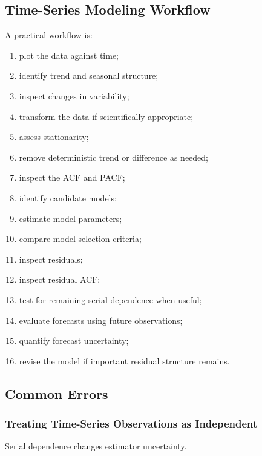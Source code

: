 \subsection{Time-Series Modeling Workflow}
\label{subsec:time-series-workflow}

A practical workflow is:

\begin{enumerate}
    \item plot the data against time;
    \item identify trend and seasonal structure;
    \item inspect changes in variability;
    \item transform the data if scientifically appropriate;
    \item assess stationarity;
    \item remove deterministic trend or difference as needed;
    \item inspect the ACF and PACF;
    \item identify candidate models;
    \item estimate model parameters;
    \item compare model-selection criteria;
    \item inspect residuals;
    \item inspect residual ACF;
    \item test for remaining serial dependence when useful;
    \item evaluate forecasts using future observations;
    \item quantify forecast uncertainty;
    \item revise the model if important residual structure remains.
\end{enumerate}

\subsection{Common Errors}
\label{subsec:time-series-common-errors}

\subsubsection{Treating Time-Series Observations as Independent}

Serial dependence changes estimator uncertainty.


